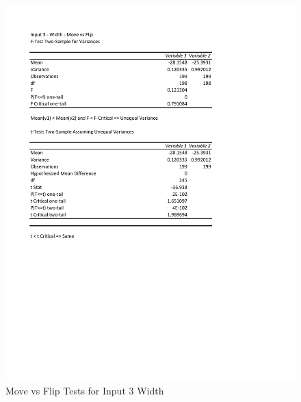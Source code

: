 \documentclass[times]{article}
\begin{document}
	\begin{figure}
		\caption{Move vs Flip Tests for Input 3 Width}
		\label{fig:3mutation_moea}
		\includegraphics[width=\textwidth]{./t_test/3_mutation_moea.pdf}
	\end{figure}
\end{document}
